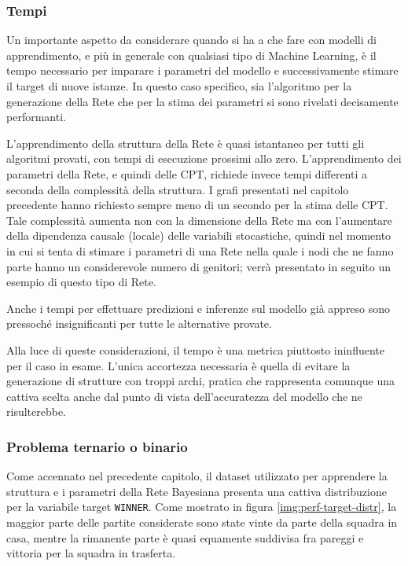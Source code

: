 \documentclass[hidelinks, 12pt]{article}
\begin{document}
\subsubsection{Tempi}

Un importante aspetto da considerare quando si ha a che fare con modelli di apprendimento, e più in generale con qualsiasi tipo di Machine Learning, è il tempo necessario per imparare i parametri del modello e successivamente stimare il target di nuove istanze. In questo caso specifico, sia l'algoritmo per la generazione della Rete che per la stima dei parametri si sono rivelati decisamente performanti.

L'apprendimento della struttura della Rete è quasi istantaneo per tutti gli algoritmi provati, con tempi di esecuzione prossimi allo zero. L'apprendimento dei parametri della Rete, e quindi delle CPT, richiede invece tempi differenti a seconda della complessità della struttura. I grafi presentati nel capitolo precedente hanno richiesto sempre meno di un secondo per la stima delle CPT. Tale complessità aumenta non con la dimensione della Rete ma con l'aumentare della dipendenza causale (locale) delle variabili stocastiche, quindi nel momento in cui si tenta di stimare i parametri di una Rete nella quale i nodi che ne fanno parte hanno un considerevole numero di genitori; verrà presentato in seguito un esempio di questo tipo di Rete.

Anche i tempi per effettuare predizioni e inferenze sul modello già appreso sono pressoché insignificanti per tutte le alternative provate.

Alla luce di queste considerazioni, il tempo è una metrica piuttosto ininfluente per il caso in esame. L'unica accortezza necessaria è quella di evitare la generazione di strutture con troppi archi, pratica che rappresenta comunque una cattiva scelta anche dal punto di vista dell'accuratezza del modello che ne risulterebbe.


\subsubsection{Problema ternario o binario}

Come accennato nel precedente capitolo, il dataset utilizzato per apprendere la struttura e i parametri della Rete Bayesiana presenta una cattiva distribuzione per la variabile target \texttt{WINNER}. Come mostrato in figura \ref{img:perf-target-distr}, la maggior parte delle partite considerate sono state vinte da parte della squadra in casa, mentre la rimanente parte è quasi equamente suddivisa fra pareggi e vittoria per la squadra in trasferta.
\end{document}

